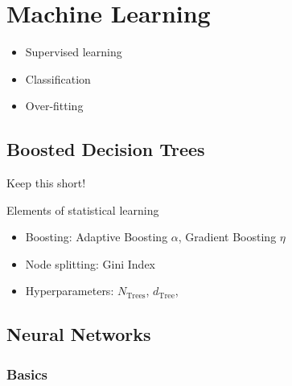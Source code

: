 \chapter{Machine Learning}
\label{sec:ml}

\begin{itemize}
\item Supervised learning
\item Classification
\item Over-fitting
\end{itemize}

\section{Boosted Decision Trees}
\label{sec:bdt}

Keep this short!

Elements of statistical learning \cite{esl}

\begin{itemize}
\item Boosting: Adaptive Boosting $\alpha$, Gradient Boosting $\eta$
\item Node splitting: Gini Index
\item Hyperparameters: $N_\mathrm{Trees}$, $d_\mathrm{Tree}$,
\end{itemize}

\section{Neural Networks}
\label{sec:nn}

\subsection{Basics}
\label{sec:nn_basics}

